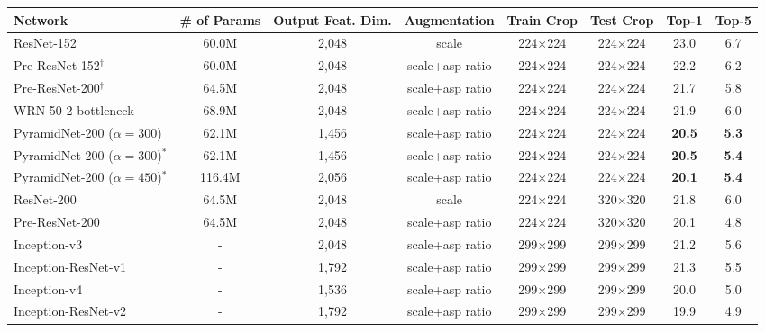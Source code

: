 \documentclass[10pt,twocolumn,letterpaper]{article}
\begin{document}
\begin{table}[t]
\fontsize{9}{10}\selectfont
\begin{center}
\centering
\begin{tabular}{|l|c|c|c|c|c|c|c|}
\hline
Network & \# of Params & Output Feat. Dim. & Augmentation & Train Crop & Test Crop & Top-1 & Top-5 \\
\hline\hline
ResNet-152~\cite{resnet} & 60.0M & 2,048 & scale & 224$\times$224 & 224$\times$224 & 23.0 & 6.7 \\
Pre-ResNet-152$^\dagger$~\cite{preresnet} & 60.0M & 2,048 & scale+asp ratio & 224$\times$224 & 224$\times$224 & 22.2 & 6.2\\
Pre-ResNet-200$^\dagger$~\cite{preresnet} & 64.5M & 2,048 & scale+asp ratio & 224$\times$224 & 224$\times$224 & 21.7 & 5.8\\
WRN-50-2-bottleneck~\cite{wideresnet} & 68.9M & 2,048 & scale+asp ratio & 224$\times$224 & 224$\times$224 & 21.9 & 6.0\\
PyramidNet-200 ($\alpha=300$) & 62.1M & 1,456 & scale+asp ratio & 224$\times$224 & 224$\times$224 & {\bf20.5} & {\bf5.3}\\
PyramidNet-200 ($\alpha=300$)$^*$ & 62.1M & 1,456 & scale+asp ratio & 224$\times$224 & 224$\times$224 & {\bf20.5} & {\bf5.4}\\
PyramidNet-200 ($\alpha=450$)$^*$ & 116.4M & 2,056 & scale+asp ratio & 224$\times$224 & 224$\times$224 & {\bf20.1} & {\bf5.4}\\
\hline
ResNet-200~\cite{resnet} & 64.5M & 2,048 & scale & 224$\times$224 & 320$\times$320 & 21.8 & 6.0\\
Pre-ResNet-200~\cite{preresnet} & 64.5M & 2,048 & scale+asp ratio & 224$\times$224 & 320$\times$320 & 20.1 & 4.8\\
Inception-v3~\cite{Inceptionv3} & - & 2,048 & scale+asp ratio  & 299$\times$299 & 299$\times$299 & 21.2 & 5.6\\
Inception-ResNet-v1~\cite{InceptionResnet}  &  - & 1,792 & scale+asp ratio & 299$\times$299 & 299$\times$299 & 21.3 & 5.5\\
Inception-v4~\cite{InceptionResnet}  & - & 1,536 & scale+asp ratio & 299$\times$299 & 299$\times$299 & 20.0 & 5.0\\
Inception-ResNet-v2~\cite{InceptionResnet}  &  - & 1,792 & scale+asp ratio & 299$\times$299 & 299$\times$299 & 19.9 & 4.9\\

\end{tabular}
\end{center}
\end{table}
\end{document}
